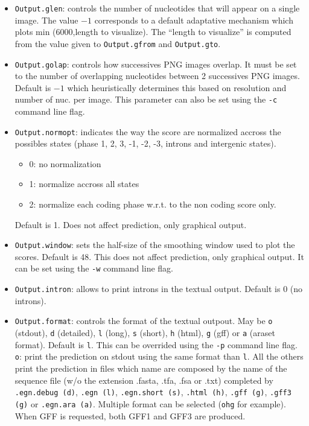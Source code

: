 \documentclass[a4paper,titlepage]{report}
\begin{document}
\begin{itemize}
\item \texttt{Output.glen}: controls the number of nucleotides that
  will appear on a single image. The value $-1$ corresponds to a
  default adaptative mechanism which plots min (6000,length to
  visualize). The ``length to visualize'' is computed from the value
  given to \texttt{Output.gfrom} and \texttt{Output.gto}.
  
\item \texttt{Output.golap}: controls how successives PNG images
  overlap. It must be set to the number of overlapping nucleotides
  between 2 successives PNG images. Default is $-1$ which
  heuristically determines this based on resolution and number of nuc.
  per image. This parameter can also be set using the \texttt{-c}
  command line flag. 
    
\item \texttt{Output.normopt}: indicates the way the score are
  normalized accross the possibles states (phase 1, 2, 3, -1, -2, -3,
  introns and intergenic states).
  \begin{itemize}
  \item 0: no normalization
  \item 1: normalize accross all states
  \item 2: normalize each coding phase w.r.t. to the non coding
    score only.
  \end{itemize}
  Default is 1. Does not affect prediction, only graphical output.

\item \texttt{Output.window}: sets the half-size of the smoothing
  window used to plot the scores.  Default is 48. This does not affect
  prediction, only graphical output. It can be set using the
  \texttt{-w} command line flag. 

\item \texttt{Output.intron}: allows to print introns in the textual output.
  Default is 0 (no introns).
 
\item \texttt{Output.format}: controls the format of the textual
  outpout. May be \texttt{o} (stdout), \texttt{d} (detailed),
  \texttt{l} (long), \texttt{s} (short), \texttt{h} (html), \texttt{g}
  (gff) or \texttt{a} (araset format). Default is \texttt{l}. This can
  be overrided using the \texttt{-p} command line
  flag. \texttt{o}:
  print the prediction on stdout using the same format than
  \texttt{l}.  All the others print the prediction in files which name
  are composed by the name of the sequence file (w/o the extension
  .fasta, .tfa, .fsa or .txt) completed by \texttt{.egn.debug (d)},
  \texttt{.egn (l)}, \texttt{.egn.short (s)}, \texttt{.html (h)},
  \texttt{.gff (g)}, \texttt{.gff3 (g)} or \texttt{.egn.ara (a)}.
  Multiple format can be selected (\texttt{ohg} for example). When GFF
  is requested, both GFF1 and GFF3 are produced.
  

\end{itemize}
\end{document}
